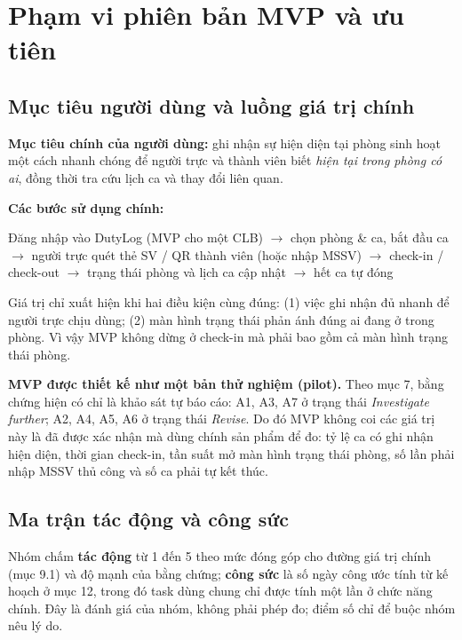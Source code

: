 \section{Phạm vi phiên bản MVP và ưu tiên}

\subsection{Mục tiêu người dùng và luồng giá trị chính}
\textbf{Mục tiêu chính của người dùng:} ghi nhận sự hiện diện tại phòng sinh hoạt một cách nhanh chóng để người trực và thành viên biết \emph{hiện tại trong phòng có ai}, đồng thời tra cứu lịch ca và thay đổi liên quan.

\textbf{Các bước sử dụng chính:}
\begin{center}
\small
Đăng nhập vào DutyLog (MVP cho một CLB) $\rightarrow$ chọn phòng \& ca, bắt đầu ca $\rightarrow$ người trực quét thẻ SV / QR thành viên (hoặc nhập MSSV) $\rightarrow$ check-in / check-out $\rightarrow$ trạng thái phòng và lịch ca cập nhật $\rightarrow$ hết ca tự đóng
\end{center}

Giá trị chỉ xuất hiện khi hai điều kiện cùng đúng: (1) việc ghi nhận đủ nhanh để người trực chịu dùng; (2) màn hình trạng thái phản ánh đúng ai đang ở trong phòng. Vì vậy MVP không dừng ở check-in mà phải bao gồm cả màn hình trạng thái phòng.

\textbf{MVP được thiết kế như một bản thử nghiệm (pilot).} Theo mục 7, bằng chứng hiện có chỉ là khảo sát tự báo cáo: A1, A3, A7 ở trạng thái \emph{Investigate further}; A2, A4, A5, A6 ở trạng thái \emph{Revise}. Do đó MVP không coi các giá trị này là đã được xác nhận mà dùng chính sản phẩm để đo: tỷ lệ ca có ghi nhận hiện diện, thời gian check-in, tần suất mở màn hình trạng thái phòng, số lần phải nhập MSSV thủ công và số ca phải tự kết thúc.

\subsection{Ma trận tác động và công sức}
Nhóm chấm \textbf{tác động} từ 1 đến 5 theo mức đóng góp cho đường giá trị chính (mục 9.1) và độ mạnh của bằng chứng; \textbf{công sức} là số ngày công ước tính từ kế hoạch ở mục 12, trong đó task dùng chung chỉ được tính một lần ở chức năng chính. Đây là đánh giá của nhóm, không phải phép đo; điểm số chỉ để buộc nhóm nêu lý do.

